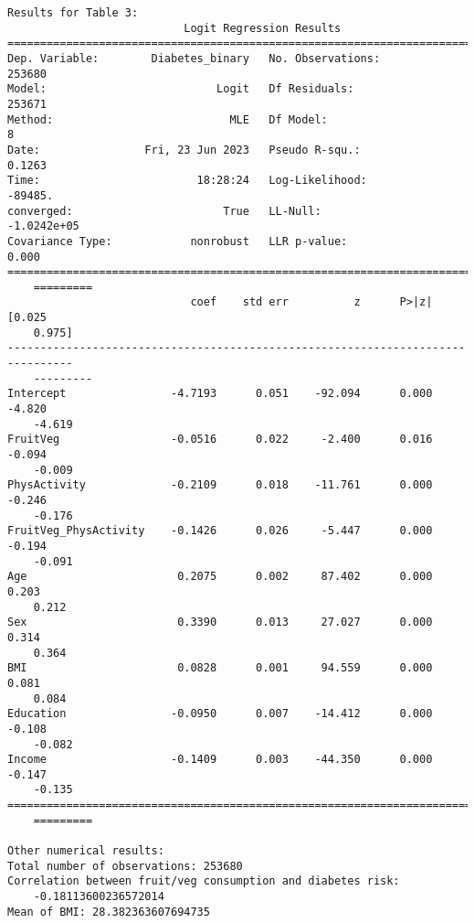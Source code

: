 \documentclass[11pt]{article}
\begin{document}
\begin{footnotesize}
\begin{Verbatim}[tabsize=4]
Results for Table 3:
                           Logit Regression Results
==============================================================================
Dep. Variable:        Diabetes_binary   No. Observations:               253680
Model:                          Logit   Df Residuals:                   253671
Method:                           MLE   Df Model:                            8
Date:                Fri, 23 Jun 2023   Pseudo R-squ.:                  0.1263
Time:                        18:28:24   Log-Likelihood:                -89485.
converged:                       True   LL-Null:                   -1.0242e+05
Covariance Type:            nonrobust   LLR p-value:                     0.000
================================================================================
	=========
                            coef    std err          z      P>|z|      [0.025
	0.975]
--------------------------------------------------------------------------------
	---------
Intercept                -4.7193      0.051    -92.094      0.000      -4.820
	-4.619
FruitVeg                 -0.0516      0.022     -2.400      0.016      -0.094
	-0.009
PhysActivity             -0.2109      0.018    -11.761      0.000      -0.246
	-0.176
FruitVeg_PhysActivity    -0.1426      0.026     -5.447      0.000      -0.194
	-0.091
Age                       0.2075      0.002     87.402      0.000       0.203
	0.212
Sex                       0.3390      0.013     27.027      0.000       0.314
	0.364
BMI                       0.0828      0.001     94.559      0.000       0.081
	0.084
Education                -0.0950      0.007    -14.412      0.000      -0.108
	-0.082
Income                   -0.1409      0.003    -44.350      0.000      -0.147
	-0.135
================================================================================
	=========

Other numerical results:
Total number of observations: 253680
Correlation between fruit/veg consumption and diabetes risk:
	-0.18113600236572014
Mean of BMI: 28.382363607694735

\end{Verbatim}
\end{footnotesize}
\end{document}
